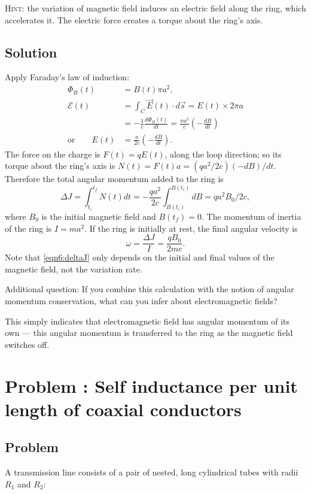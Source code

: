\documentclass[solutions]{esg8022pset}
\begin{document}
  \noindent \textsc{Hint}: the variation of magnetic field induces an
  electric field along the ring, which accelerates it. The electric force creates a torque about the ring's axis.
\subsection{Solution}
  Apply Faraday's law of induction:
  \begin{align*}
    \Phi_B(t) & = B(t)\pi a^2, \\
    {\mathcal{E}}(t) & = \int_C \vec{E}(t)\cdot d\vec{s} = E(t)\times 2\pi a \\
      & = -\frac{1}{c}\frac{d\Phi_B(t)}{dt}=\frac{\pi a^2}{c}\left(-\frac{dB}{dt}\right) \\
  \text{or}\qquad E(t) & = \frac{a}{2c}\left(-\frac{dB}{dt}\right).
  \end{align*}
  The force on the charge is $F(t)=qE(t)$, along the loop
  direction; so its torque about the ring's axis is $N(t)=F(t)a=
  (qa^2/2c)(-dB)/dt$.  Therefore the total angular momentum added to the ring is
  \begin{equation}\label{eqn6:deltaJ}
    \Delta J=\int_{t_{i}}^{t_{f}} N(t)dt=-\frac{qa^2}{2c}\int_{B(t_{i})}^{B(t_{i})}dB=qa^2 B_0/2c,
  \end{equation}
  where $B_0$ is the initial magnetic field and $B(t_{f})=0$.  The
  momentum of inertia of the ring is  $I=ma^2$.  If the ring is
  initially at rest, the final angular velocity is
  \begin{equation}
    \omega=\frac{\Delta J}{I}=\frac{qB_0}{2mc}.
  \end{equation}
  Note that \autoref{eqn6:deltaJ} only depends on the initial and final
  values of the magnetic field, not the variation rate.

  Additional question: If you combine this calculation with the notion
  of angular momentum conservation, what can you infer about
  electromagnetic fields?

  This simply indicates that electromagnetic field has angular momentum
  of its own --- this angular momentum is transferred to the ring as the
  magnetic field switches off.
\section{Problem \thesection: Self inductance per unit length of coaxial conductors }
\subsection{Problem}
  A transmission line consists of a pair of nested, long cylindrical
  tubes with radii $R_1$ and $R_2$:
\end{document}
